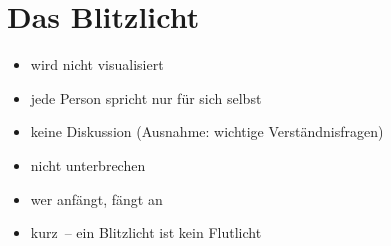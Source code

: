 \section{Das Blitzlicht}
\label{blitzlicht}

\begin{itemize}
  \item wird nicht visualisiert
  \item jede Person spricht nur für sich selbst
  \item keine Diskussion (Ausnahme: wichtige Verständnisfragen)
  \item nicht unterbrechen
  \item wer anfängt, fängt an
  \item kurz~-- ein Blitzlicht ist kein Flutlicht
\end{itemize}
